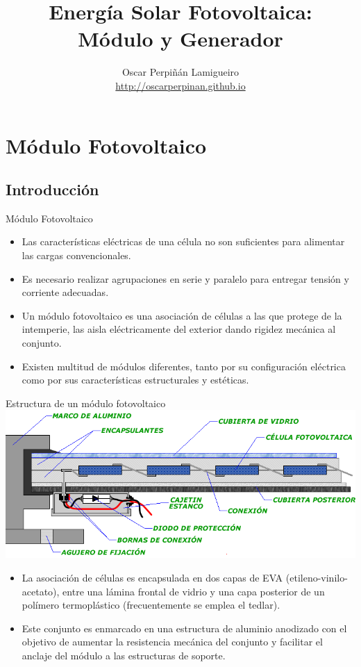 \documentclass[xcolor={usenames,svgnames,dvipsnames}]{beamer}
\author{Oscar Perpiñán Lamigueiro \\ \url{http://oscarperpinan.github.io}}
\date{}
\title{Energía Solar Fotovoltaica:\\Módulo y Generador}
\begin{document}
\maketitle

\section{Módulo Fotovoltaico}
\label{sec-1}

\subsection{Introducción}
\label{sec-1-1}

\begin{frame}[label=sec-1-1-1]{Módulo Fotovoltaico}
\begin{itemize}
\item Las características eléctricas de una célula no son suficientes para alimentar las cargas convencionales.

\item Es necesario realizar \alert{agrupaciones en serie y paralelo para entregar tensión y corriente adecuadas}.

\item Un \alert{módulo fotovoltaico} es una \alert{asociación de células} a las que \alert{protege de la intemperie}, las \alert{aisla eléctricamente} del exterior dando \alert{rigidez mecánica} al conjunto.

\item Existen multitud de módulos diferentes, tanto por su configuración eléctrica como por sus características estructurales y estéticas.
\end{itemize}
\end{frame}

\begin{frame}[label=sec-1-1-2]{Estructura de un módulo fotovoltaico}
\includegraphics[width=.9\linewidth]{../figs/panel_fv.png}

\begin{itemize}
\item La asociación de células es encapsulada en \alert{dos capas de EVA} (etileno-vinilo-acetato), entre una \alert{lámina frontal de vidrio} y una \alert{capa posterior} de un polímero termoplástico (frecuentemente se emplea el \alert{tedlar}).

\item Este conjunto es enmarcado en una \alert{estructura de aluminio anodizado} con el objetivo de aumentar la resistencia mecánica del conjunto y facilitar el anclaje del módulo a las estructuras de soporte.
\end{itemize}
\end{frame}
\end{document}
